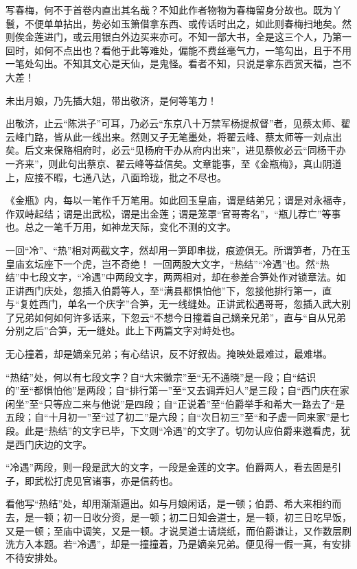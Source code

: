 {写春梅，何不于首卷内直出其名哉？不知此作者物物为春梅留身分故也。既为丫鬟，不便单单拈出，势必如玉箫借拿东西、或传话时出之，如此则春梅扫地矣。然则俟金莲进门，或云用银白外边买来亦可。不知一部大书，全是这三个人，乃第一回时，如何不点出也？看他于此等难处，偏能不费丝毫气力，一笔勾出，且于不用一笔处勾出。不知其文心是天仙，是鬼怪。看者不知，只说是拿东西赏天福，岂不大差！

未出月娘，乃先插大姐，带出敬济，是何等笔力！

出敬济，止云“陈洪子”可耳，乃必云“东京八十万禁军杨提叔督”者，见蔡太师、翟云峰门路，皆从此一线出来。然则又子无笔墨处，将翟云峰、蔡太师等一刘点出矣。后文来保赂相府时，必云“见杨府干办从府内出来”，进见蔡攸必云“同杨干办一齐来”，则此句出蔡京、翟云峰等益信矣。文章能事，至《金瓶梅》，真山阴道上，应接不暇，七通八达，八面玲珑，批之不尽也。

《金瓶》内，每以一笔作千万笔用。如此回玉皇庙，谓是结弟兄；谓是对永福寺，作双峙起结；谓是出武松，谓是出金莲；谓是笼罩“官哥寄名”，“瓶儿荐亡”等事也。总之一笔千万用，如神龙天际，变化不测的文字。

一回“冷”、“热”相对两截文字，然却用一笋即串拢，痕迹俱无。所谓笋者，乃在玉皇庙玄坛座下一个虎，岂不奇绝！
一回两股大文字，“热结”“冷遇”也。然“热结”中七段文字，“冷遇”中两段文字，两两相对，却在参差合笋处作对锁章法。如正讲西门庆处，忽插入伯爵等人，至“满县都惧怕他”下，忽接他排行第一，直与“复姓西门，单名一个庆字”合笋，无一线缝处。正讲武松遇哥哥，忽插入武大别了兄弟如何如何许多话来，下忽云“不想今日撞着自己嫡亲兄弟”，直与“自从兄弟分别之后”合笋，无一缝处。此上下两篇文字对峙处也。

无心撞着，却是嫡亲兄弟；有心结识，反不好叙齿。掩映处最难过，最难堪。

“热结”处，何以有七段文字？自“大宋徽宗”至“无不通晓”是一段；自“结识的”至“都惧怕他”是两段；自“排行第一”至“又去调弄妇人”是三段；自“西门庆在家闲坐”至“只等应二来与他说”是四段；自“正说着”至“伯爵举手和希大一路去了“是五段；自“十月初一”至“过了初二”是六段；自“次日初三”至“和子虚一同来家”是七段。此是“热结”的文字已毕，下文则“冷遇”的文字了。切勿认应伯爵来邀看虎，犹是西门庆边的文字。

“冷遇”两段，则一段是武大的文字，一段是金莲的文字。伯爵两人，看去固是引子，即武松打虎见官诸事，亦是信药也。

看他写“热结”处，却用渐渐逼出。如与月娘闲话，是一顿；伯爵、希大来相约而去，是一顿；初一日收分资，是一顿；初二日知会道士，是一顿，初三日吃早饭，又是一顿；至庙中调笑，又是一顿。才说吴道士请烧纸，而伯爵谦让，又作数层刷洗方入本题。若“冷遇”，却是一撞撞着，乃是嫡亲兄弟。便见得一假一真，有安排不待安排处。

}
